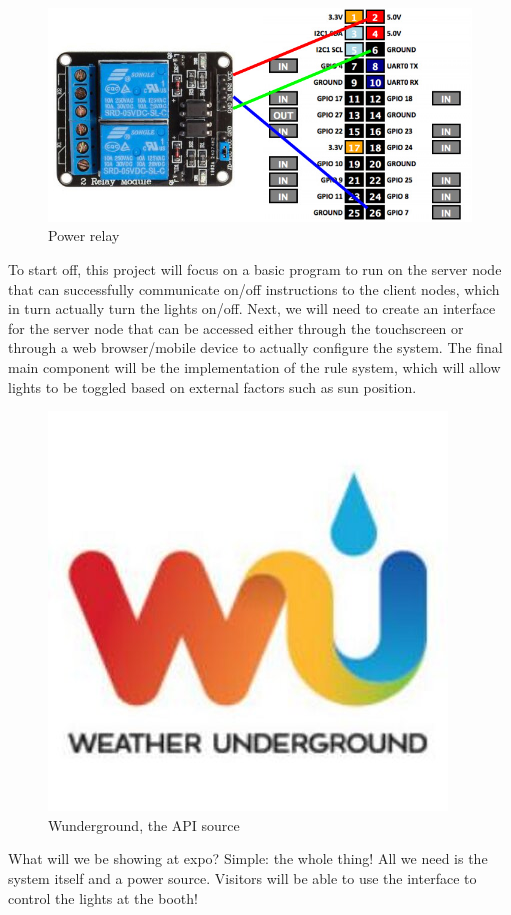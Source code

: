 \documentclass{article}
\begin{document}
\begin{figure}[h!]
\centering
\includegraphics[scale=0.5]{relay.jpg}
\caption{Power relay}
\label{fig:relay}
\end{figure}

To start off, this project will focus on a basic program to run on the server node that can successfully communicate on/off instructions to the client nodes, which in turn actually turn the lights on/off.  Next, we will need to create an interface for the server node that can be accessed either through the touchscreen or through a web browser/mobile device to actually configure the system.  The final main component will be the implementation of the rule system, which will allow lights to be toggled based on external factors such as sun position.

\begin{figure}[h!]
\centering
\includegraphics[scale=0.5]{wunder.jpeg}
\caption{Wunderground, the API source}
\label{fig:relay}
\end{figure}


What will we be showing at expo?  Simple: the whole thing!  All we need is the system itself and a power source.  Visitors will be able to use the interface to control the lights at the booth!
\end{document}
